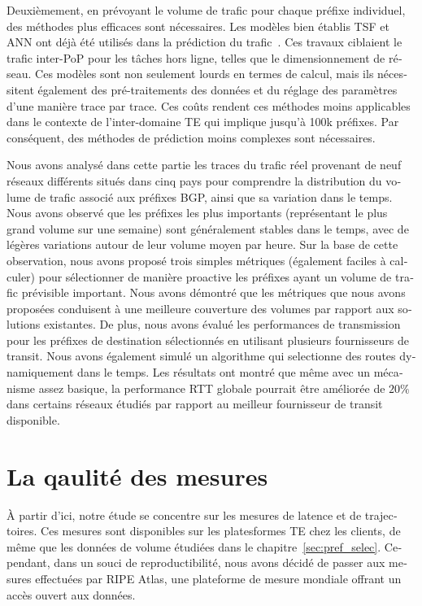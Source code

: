 \begin{otherlanguage}{french}
Deuxièmement, en prévoyant le volume de trafic pour chaque préfixe individuel, des méthodes plus efficaces sont nécessaires.
Les modèles bien établis \acf{TSF} et \acf{ANN} ont déjà été utilisés dans la prédiction du trafic~\cite{Papagiannaki2005, Cortez2006, Otoshi2013}.
Ces travaux ciblaient le trafic inter-\acf{PoP} pour les tâches hors ligne, telles que le dimensionnement de réseau.
Ces modèles sont non seulement lourds en termes de calcul, 
mais ils nécessitent également des pré-traitements des données et du réglage des paramètres d'une manière trace par trace. 
Ces coûts rendent ces méthodes moins applicables dans le contexte de l'inter-domaine TE qui implique jusqu'à 100k préfixes. 
Par conséquent, des méthodes de prédiction moins complexes sont nécessaires.

Nous avons analysé dans cette partie les traces du trafic réel provenant de neuf réseaux différents situés dans cinq pays 
pour comprendre la distribution du volume de trafic associé aux préfixes BGP, ainsi que sa variation dans le temps.
Nous avons observé que les préfixes les plus importants (représentant le plus grand volume sur une semaine) 
sont généralement stables dans le temps, avec de légères variations autour de leur volume moyen par heure.
Sur la base de cette observation, nous avons proposé trois simples
métriques (également faciles à calculer) pour sélectionner de manière proactive les préfixes ayant un volume de trafic prévisible important.
Nous avons démontré que les métriques que nous avons proposées conduisent à une meilleure couverture des volumes par rapport aux solutions existantes.
De plus, nous avons évalué les performances de transmission pour les préfixes de destination sélectionnés en utilisant plusieurs fournisseurs de transit.
Nous avons également simulé un algorithme qui selectionne des routes dynamiquement dans le temps.
Les résultats ont montré que même avec un mécanisme assez basique, 
la performance RTT globale pourrait être améliorée de $20\%$ dans certains réseaux étudiés par rapport au meilleur fournisseur de transit disponible.

\section*{La qaulité des mesures}

À partir d'ici, notre étude se concentre sur les mesures de latence et de trajectoires.
Ces mesures sont disponibles sur les platesformes TE chez les clients, de même que les données de volume étudiées dans le chapitre~\ref{sec:pref_selec}.
Cependant, dans un souci de reproductibilité, nous avons décidé de passer aux mesures effectuées par RIPE Atlas, une plateforme de mesure mondiale offrant un accès ouvert aux données. 


\end{otherlanguage}
